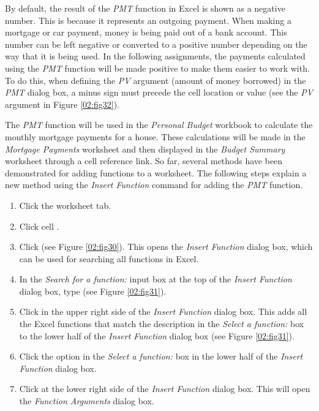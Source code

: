 By default, the result of the \textit{PMT} function in Excel is shown as a negative number. This is because it represents an outgoing payment. When making a mortgage or car payment, money is being paid out of a bank account. This number can be left negative or converted to a positive number depending on the way that it is being used. In the following assignments, the payments calculated using the \textit{PMT} function will be made positive to make them easier to work with. To do this, when defining the \textit{PV} argument (amount of money borrowed) in the \textit{PMT} dialog box, a minus sign must precede the cell location or value (see the \textit{PV} argument in Figure \ref{02:fig32}).

The \textit{PMT} function will be used in the \textit{Personal Budget} workbook to calculate the monthly mortgage payments for a house. These calculations will be made in the \textit{Mortgage Payments} worksheet and then displayed in the \textit{Budget Summary} worksheet through a cell reference link. So far, several methods have been demonstrated for adding functions to a worksheet. The following steps explain a new method using the \textit{Insert Function} command for adding the \textit{PMT} function.

\begin{enumerate}
	\item Click the  worksheet tab.
	\item Click cell .
	\item Click  (see Figure \ref{02:fig30}). This opens the \textit{Insert Function} dialog box, which can be used for searching all functions in Excel.
	\item In the \textit{Search for a function:} input box at the top of the \textit{Insert Function} dialog box, type  (see Figure \ref{02:fig31}). 
	\item Click  in the upper right side of the \textit{Insert Function} dialog box. This adds all the Excel functions that match the description in the \textit{Select a function:} box to the lower half of the \textit{Insert Function} dialog box (see Figure \ref{02:fig31}).
	\item Click the  option in the \textit{Select a function:} box in the lower half of the \textit{Insert Function} dialog box.
	\item Click  at the lower right side of the \textit{Insert Function} dialog box. This will open the \textit{Function Arguments} dialog box.
\end{enumerate}

